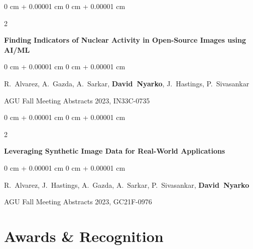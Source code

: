 \documentclass[10pt, letterpaper]{article}
\newenvironment{onecolentry}{
    \begin{adjustwidth}{
        0 cm + 0.00001 cm
    }{
        0 cm + 0.00001 cm
    }
}{
    \end{adjustwidth}
} %
\newenvironment{twocolentry}[2][]{
    \onecolentry
    \def\secondColumn{#2}
    \setcolumnwidth{\fill, 4.5 cm}
    \begin{paracol}{2}
}{
    \switchcolumn \raggedleft \secondColumn
    \end{paracol}
    \endonecolentry
} %
\begin{document}
    \vspace{0.2 cm}

    \begin{samepage}
        \begin{twocolentry}{
            2023
        }
            \textbf{Finding Indicators of Nuclear Activity in Open-Source Images using AI/ML}
        \end{twocolentry}

        \vspace{0.10 cm}

        \begin{onecolentry}
            \mbox{R. Alvarez}, \mbox{A. Gazda}, \mbox{A. Sarkar}, \mbox{\textbf{David Nyarko}}, \mbox{J. Hastings}, \mbox{P. Sivasankar}

            \vspace{0.10 cm}

            AGU Fall Meeting Abstracts 2023, IN33C-0735
        \end{onecolentry}
    \end{samepage}

    \vspace{0.2 cm}

    \begin{samepage}
        \begin{twocolentry}{
            2023
        }
            \textbf{Leveraging Synthetic Image Data for Real-World Applications}
        \end{twocolentry}

        \vspace{0.10 cm}

        \begin{onecolentry}
            \mbox{R. Alvarez}, \mbox{J. Hastings}, \mbox{A. Gazda}, \mbox{A. Sarkar}, \mbox{P. Sivasankar}, \mbox{\textbf{David Nyarko}}

            \vspace{0.10 cm}

            AGU Fall Meeting Abstracts 2023, GC21F-0976
        \end{onecolentry}
    \end{samepage}



    \section{Awards \& Recognition}
\end{document}
